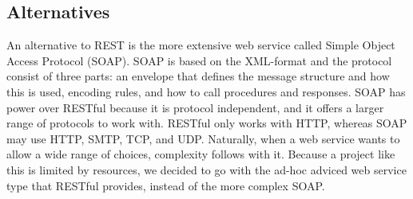 \subsection{Alternatives}
\label{subsec:restAlt}
An alternative to REST is the more extensive web service called Simple Object Access Protocol (SOAP). SOAP is based on the XML-format and the protocol consist of three parts: an envelope that defines the message structure and how this is used, encoding rules, and how to call procedures and responses\cite{SOAP}. SOAP has power over RESTful because it is protocol independent, and it offers a larger range of protocols to work with. RESTful only works with HTTP, whereas SOAP may use HTTP, SMTP, TCP, and UDP. Naturally, when a web service wants to allow a wide range of choices, complexity follows with it. Because a project like this is limited by resources, we decided to go with the ad-hoc adviced web service type that RESTful provides, instead of the more complex SOAP\cite{DecidingOnRESTful}.